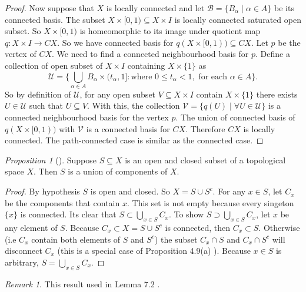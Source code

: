 \documentclass[a4paper]{article}
\theoremstyle{remark}
\newtheorem*{remark}{Remark}
\newtheorem{prop}{Proposition}
\newcommand{\subhim}{\subseteq} %
\begin{document}
\begin{proof}
	Now suppose that $X$ is locally connected and let $\mathcal{B} = \{B_{\alpha} \mid \alpha \in A\}$ be its connected basis. The subset $X \times [0,1) \subhim X \times I$ is locally connected saturated open subset. So $X \times [0,1)$ is homeomorphic to its image under quotient map $q : X \times I \to CX$. So we have connected basis for $q(X \times [0,1)) \subhim CX$. Let $p$ be the vertex of $CX$. We need to find a connected neighbourhood basis for $p$. Define a collection of open subset of $X \times I$ containing $X \times \{1\}$ as 
	$$
	\mathcal{U} = \{ \bigcup_{\alpha \in A} B_{\alpha} \times (t_{\alpha},1] : \text{where }  0 \leq t_{\alpha} < 1, \text{ for each }\alpha \in A \}.
	$$
	So by definition of $\mathcal{U}$, for any open subset  $V \subhim X \times I$ contain $X \times \{1\}$ there exists $U \in \mathcal{U}$ such that $U \subhim V$. With this, the collection $\mathcal{V} = \{ q(U) \mid \forall U \in \mathcal{U} \}$ is a connected neighbourhood basis for the vertex $p$. The union of connected basis of $q(X \times [0,1))$ with $\mathcal{V}$ is a connected basis for $CX$. Therefore $CX$ is  locally connected. The path-connected case is similar as the connected case.
 \end{proof}

\begin{prop}
[\cite{LeeTM}] Suppose $S\subseteq X$ is an open and closed subset of a topological space $X$. Then $S$ is a union of components of $X$.
\end{prop}
\begin{proof}
By hypothesis $S$ is open and closed. So $X = S \cup S^c$. For any $x \in S$, let $C_x$ be the components that contain $x$. This set is not empty because every singeton $\{x\}$ is connected. Its clear that $S \subset \bigcup_{x \in S} C_x$. To show $S \supset \bigcup_{x \in S} C_x$, let $x$ be any element of $S$. Because $C_x \subset X=S \cup S^c$ is connected, then $C_x \subset S$. Otherwise (i.e $C_x$ contain both elements of $S$ and $S^c$) the subset $C_x \cap S$ and $C_x\cap S^c$ will disconnect $C_x$ (this is a special case of Proposition 4.9(a) \cite{LeeTM}). Because $x \in S$ is arbitrary, $S = \bigcup_{x \in S} C_x$.  
\end{proof}
\begin{remark}
This result used in Lemma 7.2 \cite{LeeSM}.
\end{remark}
\end{document}
